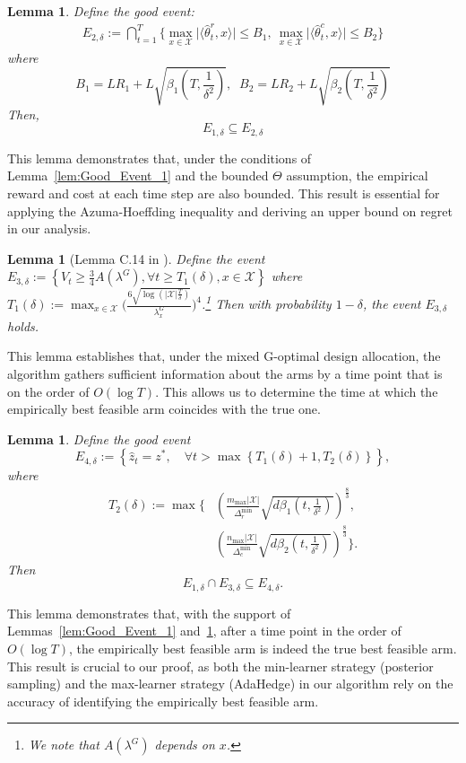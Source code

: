 \documentclass[accepted]{uai2025} %
\theoremstyle{plain}
\newtheorem{lemma}[theorem]{Lemma}
\theoremstyle{definition}
\theoremstyle{remark}
\newcommand{\cbr}[1]{\left\{#1\right\}}
\begin{document}
\begin{lemma}
\label{lem:Good_Event_2}
Define the good event:
\begin{multline*}
    E_{2,\delta} := \bigcap_{t=1}^T\Big\{ \max_{x\in \mathcal{X}} \lvert \langle \hat{\theta}_t^r, x \rangle \rvert \le B_1 
    ,~\max_{x\in \mathcal{X}} \lvert \langle \hat{\theta}_t^c, x \rangle \rvert \le B_2 \Big\}
\end{multline*}
where
\[
B_1 = L R_1 + L \sqrt{\beta_1\left(T, \frac{1}{\delta^2}\right)}, \;\; B_2 = L R_2 + L \sqrt{\beta_2\left(T, \frac{1}{\delta^2}\right)}
\]
Then,
\[
E_{1,\delta} \subseteq E_{2,\delta}
\]
\end{lemma}
This lemma demonstrates that, under the conditions of Lemma~\ref{lem:Good_Event_1} and the bounded $\Theta$ assumption, the empirical reward and cost at each time step are also bounded. This result is essential for applying the Azuma-Hoeffding inequality and deriving an upper bound on regret in our analysis.
\begin{lemma}[Lemma C.14 in \citet{li2024optimal}]
    \label{lem:GoodEvent_3}
    Define the event $E_{3,\delta}:= \cbr{V_t \ge \frac{3}{4}A(\lambda^G), \forall t\ge T_1(\delta), x\in \mathcal{X}}$ where $T_1(\delta):=\max_{x \in \mathcal{X}} \Big( \frac{6 \sqrt{\log(|\mathcal{X}|  \frac{T}{\delta})}}{\lambda_x^G} \Big)^4$.\footnote{We note that $A(\lambda^G)$ depends on $x$.}
    Then with probability $1-\delta$, the event $E_{3,\delta}$ holds.
\end{lemma}
This lemma establishes that, under the mixed G-optimal design allocation, the algorithm gathers sufficient information about the arms by a time point that is on the order of $O(\log T)$. This allows us to determine the time  at which the empirically best feasible arm coincides with the true one.


\begin{lemma}
    \label{lem:GoodEvent_4} 
    Define the good event 
    \[
    E_{4,\delta} := \left\{ \hat{z}_t = z^*, \quad \forall t > \max \left\{ T_1(\delta) + 1, T_2(\delta) \right\} \right\},
    \]
    where
    \begin{align*}
    T_2(\delta) := \max \Bigg\{ 
    &\left( \frac{m_\text{max} |\mathcal{X}|}{\Delta_r^\text{min}} \sqrt{d \beta_1(t, \frac{1}{\delta^2})} \right)^{\frac{8}{3}}, \\
    &\left( \frac{n_\text{max} |\mathcal{X}|}{\Delta_c^\text{min}} \sqrt{d \beta_2(t, \frac{1}{\delta^2})} \right)^{\frac{8}{3}} 
    \Bigg\}.
\end{align*}
    Then
    \[
    E_{1,\delta} \cap E_{3,\delta} \subseteq E_{4,\delta}.
    \]
\end{lemma}
This lemma demonstrates that, with the support of Lemmas~\ref{lem:Good_Event_1} and~\ref{lem:GoodEvent_3}, after a time point in the order of $O(\log T)$, the empirically best feasible arm is indeed the true best feasible arm. This result is crucial to our proof, as both the min-learner strategy (posterior sampling) and the max-learner strategy (AdaHedge) in our algorithm rely on the accuracy of identifying the empirically best feasible arm.
\end{document}
